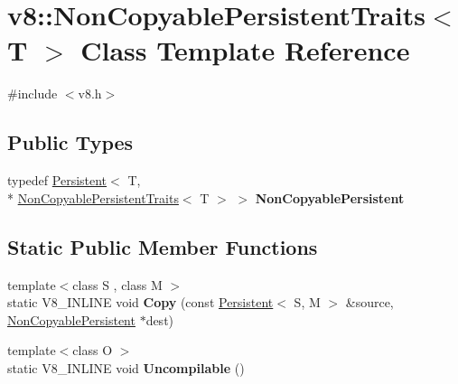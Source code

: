 \hypertarget{classv8_1_1NonCopyablePersistentTraits}{\section{v8\-:\-:Non\-Copyable\-Persistent\-Traits$<$ T $>$ Class Template Reference}
\label{classv8_1_1NonCopyablePersistentTraits}
}


{\ttfamily \#include $<$v8.\-h$>$}

\subsection*{Public Types}
\begin{DoxyCompactItemize}
\item 
\hypertarget{classv8_1_1NonCopyablePersistentTraits_af26082b31726b82c0482a01daa2f3e54}{typedef \hyperlink{classv8_1_1Persistent}{Persistent}$<$ T, \\*
\hyperlink{classv8_1_1NonCopyablePersistentTraits}{Non\-Copyable\-Persistent\-Traits}$<$ T $>$ $>$ {\bfseries Non\-Copyable\-Persistent}}\label{classv8_1_1NonCopyablePersistentTraits_af26082b31726b82c0482a01daa2f3e54}

\end{DoxyCompactItemize}
\subsection*{Static Public Member Functions}
\begin{DoxyCompactItemize}
\item 
\hypertarget{classv8_1_1NonCopyablePersistentTraits_a40b133b17a334c5c7674135e7dbcf850}{{\footnotesize template$<$class S , class M $>$ }\\static V8\-\_\-\-I\-N\-L\-I\-N\-E void {\bfseries Copy} (const \hyperlink{classv8_1_1Persistent}{Persistent}$<$ S, M $>$ \&source, \hyperlink{classv8_1_1Persistent}{Non\-Copyable\-Persistent} $\ast$dest)}\label{classv8_1_1NonCopyablePersistentTraits_a40b133b17a334c5c7674135e7dbcf850}

\item 
\hypertarget{classv8_1_1NonCopyablePersistentTraits_a90e2c6958ba089f5fabbbc7c08f976c1}{{\footnotesize template$<$class O $>$ }\\static V8\-\_\-\-I\-N\-L\-I\-N\-E void {\bfseries Uncompilable} ()}\label{classv8_1_1NonCopyablePersistentTraits_a90e2c6958ba089f5fabbbc7c08f976c1}

\end{DoxyCompactItemize}
